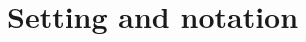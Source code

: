 \documentclass[10pt]{article}
\newcommand{\cL}{\mathcal{L}}
\renewcommand{\d}{\mathrm{d}}
\newcommand{\e}{\mathrm{e}}
\newcommand{\uonetilde}{\widetilde{u}_{1,\beta}^{h_0,h_1}}
\newcommand{\uone}{u_{1,\beta}^{h_0,h_1}}
\newcommand{\utwo}{u_{2,\beta}^{h_0,h_1}}
\newcommand{\utwotilde}{\widetilde{u}_{2,\beta}^{h_0,h_1}}
\newcommand{\lambdaone}{\lambda_{1,\beta}^{h_0,h_1}}
\newcommand{\1}{\mathbbm 1}
\begin{document}


    \tableofcontents

    \section{Setting and notation}
\end{document}
